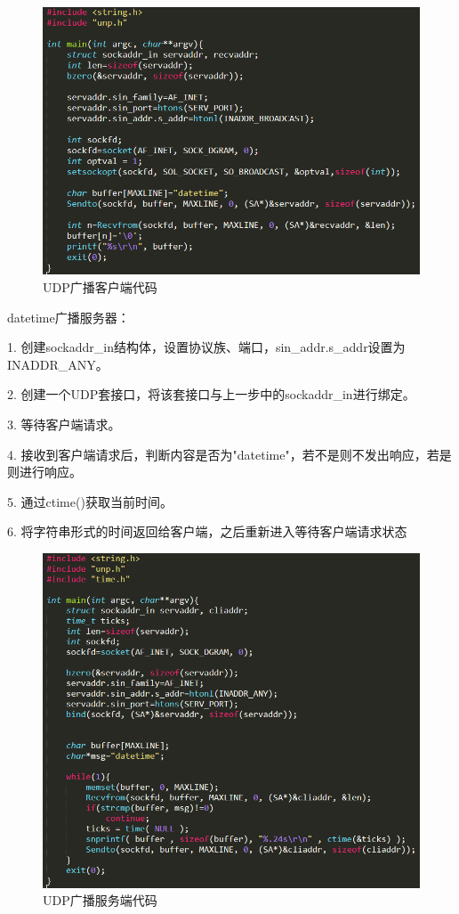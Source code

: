 \documentclass[UTF8]{ctexart}
\begin{document}
\begin{figure}[H]
\includegraphics[width=\textwidth]{pic/broadcastc.PNG}
\caption{UDP广播客户端代码}
\end{figure}

datetime广播服务器：

1. 创建sockaddr\_in结构体，设置协议族、端口，sin\_addr.s\_addr设置为INADDR\_ANY。

2. 创建一个UDP套接口，将该套接口与上一步中的sockaddr\_in进行绑定。

3. 等待客户端请求。

4. 接收到客户端请求后，判断内容是否为"datetime"，若不是则不发出响应，若是则进行响应。

5. 通过ctime()获取当前时间。

6. 将字符串形式的时间返回给客户端，之后重新进入等待客户端请求状态


\begin{figure}[H]
\includegraphics[width=\textwidth]{pic/broadcasts.PNG}
\caption{UDP广播服务端代码}
\end{figure}
\end{document}
